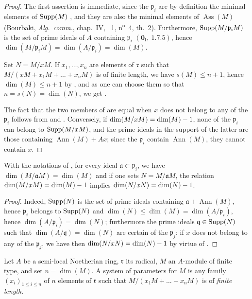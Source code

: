\begin{proof}
The first assertion is immediate, since the $\mathfrak{p}_i$ are by definition the minimal elements of $\operatorname{Supp}(M)$ , and they are also the minimal elements of $\operatorname{Ass}(M)$ (Bourbaki, \emph{Alg.~comm.}, chap.~IV, \textsection~1, n\textsuperscript{o}~4, th.~2).
Furthermore, $\operatorname{Supp}(M/\mathfrak{p}_i M)$ is the set of prime ideals of $A$ containing $\mathfrak{p}_i$ $(\mathbf{0}_\mathrm{I},~1.7.5)$, hence $\dim(M/\mathfrak{p}_i M)=\dim(A/\mathfrak{p}_i)=\dim(M)$.

Set $N=M/x M$.
If $x_1,\ldots,x_n$ are elements of $\mathfrak{r}$ such that $M/(x M+x_1M+\ldots+x_n M)$ is of finite length, we have $s(M)\leq n+1$, hence $\dim(M)\leq n+1$ by , and as one can choose them so that $n=s(N)=\dim(N)$, we get .

The fact that the two members of  are equal when $x$ does not belong to any of the $\mathfrak{p}_i$ follows from  and .
Conversely, if  $\dim(M/x M)=\dim(M)- 1$, none of the $\mathfrak{p}_i$ can belong to $\operatorname{Supp}(M/x M)$, and the prime ideals in the support of the latter are those containing $\operatorname{Ann}(M)+Ax$; since the $\mathfrak{p}_i$ contain $\operatorname{Ann}(M)$, they cannot contain $x$.
\end{proof}

\begin{corollary}[16.3.5]
\label{0.16.3.5}
With the notations of , for every ideal $\mathfrak{a}\subset\mathfrak{p}_i$, we have $\dim(M/\mathfrak{a}M)=\dim(M)$ and if one sets $N=M/\mathfrak{a}M$, the relation $\dim(M/x M)=\dim(M)- 1$ implies $\dim(N/x N)=\dim(N)- 1$.
\end{corollary}

\begin{proof}
Indeed, $\operatorname{Supp}(N)$ is the set of prime ideals containing $\mathfrak{a}+\operatorname{Ann}(M)$, hence $\mathfrak{p}_i$ belongs to $\operatorname{Supp}(N)$ and $\dim(N)\leq\dim(M)=\dim(A/\mathfrak{p}_i)$, hence $\dim(A/\mathfrak{p}_i)=\dim(N)$; furthermore the prime ideals $\mathfrak{q}\in\operatorname{Supp}(N)$ such that $\dim(A/\mathfrak{q})=\dim(N)$ are certain of the $\mathfrak{p}_j$; if $x$ does not belong to any of the $\mathfrak{p}_j$, we have then $\dim(N/x N)=\dim(N)- 1$ by virtue of .
\end{proof}

\begin{definition}[16.3.6]
\label{0.16.3.6}
Let $A$ be a semi-local Noetherian ring, $\mathfrak{r}$ its radical, $M$ an $A$-module of finite type, and set $n=\dim(M)$.
A system of parameters for $M$ is any family $(x_i)_{1\leq i\leq n}$ of $n$ elements of $\mathfrak{r}$ such that $M/(x_1M+\ldots+x_n M)$ is of \emph{finite length}.
\end{definition}


